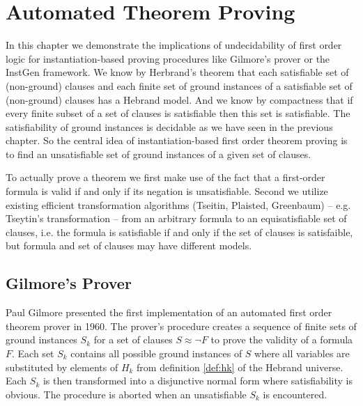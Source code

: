 
\chapter{Automated Theorem Proving}



In this chapter we demonstrate the implications of undecidability of first order logic 
for instantiation-based proving procedures like Gilmore's prover or the InstGen framework.
%
We know by Herbrand's theorem 
that each satisfiable set of (non-ground) clauses
and each finite set of ground instances of a satisfiable set of (non-ground) clauses
has a Hebrand model. 
And we know by compactness 
that if every finite subset of a set of clauses is satisfiable then this set is satisfiable.
The satisfiability of ground instances is decidable as we have seen in the previous chapter.
So the central idea of instantiation-based first order theorem proving 
is to find an unsatisfiable set of ground instances of a given set of clauses.

To actually prove a theorem 
we first make use of the fact that a first-order formula is valid if and only if its negation is unsatisfiable.
Second we utilize existing efficient transformation algorithms (Tseitin, Plaisted, Greenbaum) 
\cite{tseitin70} \cite{PLAISTED1986293}
-- e.g. Tseytin's transformation -- from an arbitrary formula to an equisatisfiable set of clauses, 
i.e. the formula is satisfiable if and only if the set of clauses is satisfaible, 
but formula and set of clauses may have different models.








\section{Gilmore's Prover}

Paul Gilmore presented the first {\myem implementation} \cite{5392528} of an automated first order theorem prover in 1960.
%
The prover's procedure 
creates a sequence of finite sets of ground instances $S_k$ 
for a set of clauses $S\approx\lnot F$ to prove the validity of a formula $F$.
Each set $S_k$ contains all possible ground instances of $S$ 
where all variables are substituted by elements of $H_k$
from definition \ref{def:hk} of the Hebrand universe.
Each $S_k$ is then transformed into a disjunctive normal form where satisfiability is obvious.
The procedure is aborted when an unsatisfiable $S_k$ is encountered.

